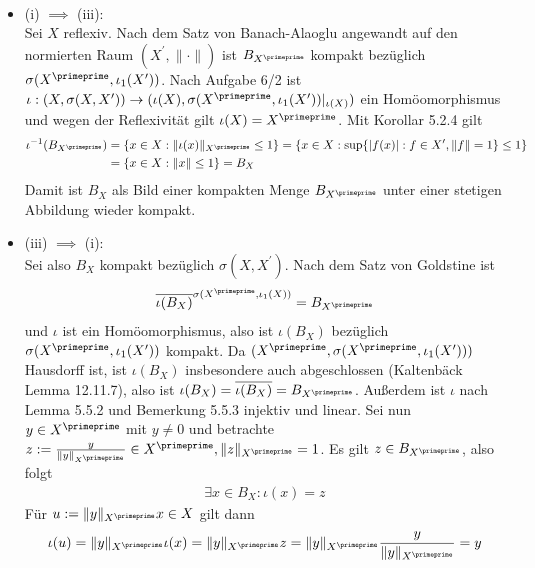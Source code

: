 \begin{solution}
\leavevmode \\
\begin{itemize}
  \item (i) $\implies$ (iii): \\
  Sei $X$ reflexiv. Nach dem Satz von Banach-Alaoglu
  angewandt auf den normierten Raum $(X^{\prime},\|\cdot\|)$ ist $B_{X^{\primeprime}}$
  kompakt bezüglich $\sigma(X^{\primeprime}, \iota_1(X^{\prime}))$.
  Nach Aufgabe 6/2 ist $\iota: (X,\sigma(X,X^{\prime})) \to
  (\iota(X),\sigma(X^{\primeprime},\iota_1(X^{\prime}))|_{\iota(X)})$ ein Homöomorphismus
  und wegen der Reflexivität gilt $\iota(X) = X^{\primeprime}$.
  Mit Korollar 5.2.4 gilt
  \begin{align*}
    \iota^{-1}(B_{X^{\primeprime}}) &= \{x \in X: \|\iota(x)\|_{X^{\primeprime}} \leq 1\}
    = \{x \in X: \sup\{|f(x)|: f \in X^{\prime}, \|f\| = 1 \} \leq 1\} \\
    &= \{x \in X: \|x\| \leq 1\} = B_X
  \end{align*}
  Damit ist $B_X$ als Bild einer kompakten Menge $B_{X^{\primeprime}}$ unter einer
  stetigen Abbildung wieder kompakt.
  \item (iii) $\implies$ (i): \\
  Sei also $B_X$ kompakt bezüglich $\sigma(X,X^{\prime})$. Nach dem Satz von Goldstine
  ist
  \begin{align*}
    \overline{\iota(B_X)}^{\sigma(X^{\primeprime},\iota_1(X))} = B_{X^{\primeprime}}
  \end{align*}
  und $\iota$ ist ein Homöomorphismus, also ist $\iota(B_X)$ bezüglich
  $\sigma(X^{\primeprime}, \iota_1(X^{\prime}))$ kompakt. Da
  $(X^{\primeprime}, \sigma(X^{\primeprime}, \iota_1(X^{\prime})))$ Hausdorff ist,
  ist $\iota(B_X)$ insbesondere auch abgeschlossen (Kaltenbäck Lemma 12.11.7),
  also ist $\iota(B_X) = \overline{\iota(B_X)} = B_{X^{\primeprime}}$.
  Außerdem ist $\iota$ nach Lemma 5.5.2 und Bemerkung 5.5.3 injektiv und linear.
  Sei nun $y \in X^{\primeprime}$ mit $y \neq 0$ und betrachte
  $z := \frac{y}{\|y\|_{X^{\primeprime}}} \in X^{\primeprime}, \|z\|_{X^{\primeprime}} = 1$.
  Es gilt $z \in B_{X^{\primeprime}}$, also folgt
  \begin{align*}
    \exists x \in B_X: \iota(x) = z
  \end{align*}
  Für $u := \|y\|_{X^{\primeprime}}x \in X$ gilt dann
  \begin{align*}
    \iota(u) = \|y\|_{X^{\primeprime}}\iota(x) = \|y\|_{X^{\primeprime}}z
    = \|y\|_{X^{\primeprime}} \frac{y}{\|y\|_{X^{\primeprime}}} = y

\end{align*}
\end{itemize}
\end{solution}
